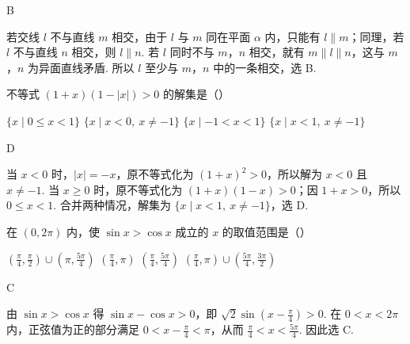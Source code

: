 \begin{answer}
B
\end{answer}

\begin{solution}
若交线 \(l\) 不与直线 \(m\) 相交，由于 \(l\) 与 \(m\) 同在平面 \(\alpha\) 内，只能有 \(l\parallel m\)；同理，若 \(l\) 不与直线 \(n\) 相交，则 \(l\parallel n\). 若 \(l\) 同时不与 \(m\)，\(n\) 相交，就有 \(m\parallel l\parallel n\)，这与 \(m\)，\(n\) 为异面直线矛盾. 所以 \(l\) 至少与 \(m\)，\(n\) 中的一条相交，选 B.
\end{solution}

\begin{problem}
不等式 \((1 + x)(1 - |x|) > 0\) 的解集是（\quad）

\choices
    {\(\{x\mid 0\leqslant x < 1\}\)}
    {\(\{x\mid x < 0,\ x\neq -1\}\)}
    {\(\{x\mid -1 < x < 1\}\)}
    {\(\{x\mid x < 1,\ x\neq -1\}\)}
\end{problem}

\begin{answer}
D
\end{answer}

\begin{solution}
当 \(x<0\) 时，\(|x|=-x\)，原不等式化为 \((1+x)^2>0\)，所以解为 \(x<0\) 且 \(x\neq-1\). 当 \(x\geqslant0\) 时，原不等式化为 \((1+x)(1-x)>0\)；因 \(1+x>0\)，所以 \(0\leqslant x<1\). 合并两种情况，解集为 \(\{x\mid x<1,\ x\neq-1\}\)，选 D.
\end{solution}

\begin{problem}
在 \((0,2\pi)\) 内，使 \(\sin x > \cos x\) 成立的 \(x\) 的取值范围是（\quad）

\choices
    {\(\left(\frac{\pi}{4},\frac{\pi}{2}\right)\cup \left(\pi,\frac{5\pi}{4}\right)\)}
    {\(\left(\frac{\pi}{4},\pi\right)\)}
    {\(\left(\frac{\pi}{4},\frac{5\pi}{4}\right)\)}
    {\(\left(\frac{\pi}{4},\pi\right) \cup \left(\frac{5\pi}{4},\frac{3\pi}{2}\right)\)}
\end{problem}

\begin{answer}
C
\end{answer}

\begin{solution}
由 \(\sin x>\cos x\) 得 \(\sin x-\cos x>0\)，即 \(\sqrt{2}\sin\left(x-\frac{\pi}{4}\right)>0\). 在 \(0<x<2\pi\) 内，正弦值为正的部分满足 \(0<x-\frac{\pi}{4}<\pi\)，从而 \(\frac{\pi}{4}<x<\frac{5\pi}{4}\). 因此选 C.
\end{solution}

